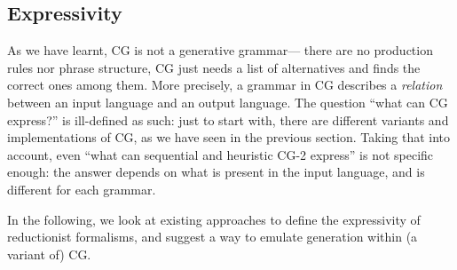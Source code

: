 

\subsection{Expressivity}
\label{sec:expressivity}




As we have learnt, CG is not a generative grammar---
there are no production rules nor phrase structure,
CG just needs a list of alternatives and finds the correct ones among them.
More precisely, a grammar in CG describes a \emph{relation} between an input language 
and an output language. %
The question ``what can CG express?'' is ill-defined as such: 
just to start with, there are different variants and implementations of CG, as we have seen in the previous section.
Taking that into account, even ``what can sequential and heuristic CG-2 express'' is not specific enough: 
the answer depends on what is present in the input language, and is different for each grammar.

In the following, we look at existing approaches to define the expressivity of reductionist formalisms, 
and suggest a way to emulate generation within (a variant of) CG.

